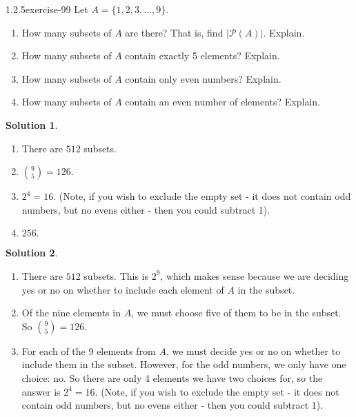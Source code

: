 \documentclass[twoside,11pt,]{book}
\numberwithin{equation}{chapter}
\newcommand{\pow}{\mathcal P}
\begin{document}
\begin{divisionsolution}{1.2.5}{}{exercise-99}%
\hypertarget{p-1598}{}%
Let \(A = \{1,2,3,\ldots,9\}\text{.}\)\leavevmode%
\begin{enumerate}[label=(\alph*)]
\item\hypertarget{li-1126}{}\hypertarget{p-1599}{}%
How many subsets of \(A\) are there? That is, find \(|\pow(A)|\text{.}\) Explain.%
\item\hypertarget{li-1127}{}\hypertarget{p-1601}{}%
How many subsets of \(A\) contain exactly 5 elements? Explain.%
\item\hypertarget{li-1128}{}\hypertarget{p-1603}{}%
How many subsets of \(A\) contain only even numbers? Explain.%
\item\hypertarget{li-1129}{}\hypertarget{p-1605}{}%
How many subsets of \(A\) contain an even number of elements? Explain.%
\end{enumerate}
%
\par\smallskip%
\noindent\textbf{Solution 1}.\quad%
\hypertarget{p-1607}{}%
\leavevmode%
\begin{enumerate}[label=(\alph*)]
\item\hypertarget{li-1130}{}\hypertarget{p-1608}{}%
There are \(512\) subsets.%
\item\hypertarget{li-1131}{}\hypertarget{p-1609}{}%
\({9 \choose 5} = 126\text{.}\)%
\item\hypertarget{li-1132}{}\hypertarget{p-1610}{}%
\(2^4 = 16\text{.}\) (Note, if you wish to exclude the empty set - it does not contain odd numbers, but no evens either - then you could subtract 1).%
\item\hypertarget{li-1133}{}\hypertarget{p-1611}{}%
\(256\text{.}\)%
\end{enumerate}
%
\par\smallskip%
\noindent\textbf{Solution 2}.\quad%
\hypertarget{p-1612}{}%
\leavevmode%
\begin{enumerate}[label=(\alph*)]
\item\hypertarget{li-1134}{}\hypertarget{p-1613}{}%
There are \(512\) subsets. This is \(2^9\text{,}\) which makes sense because we are deciding yes or no on whether to include each element of \(A\) in the subset.%
\item\hypertarget{li-1135}{}\hypertarget{p-1614}{}%
Of the nine elements in \(A\text{,}\) we must choose five of them to be in the subset. So \({9 \choose 5} = 126\text{.}\)%
\item\hypertarget{li-1136}{}\hypertarget{p-1615}{}%
For each of the 9 elements from \(A\text{,}\) we must decide yes or no on whether to include them in the subset. However, for the odd numbers, we only have one choice: no. So there are only 4 elements we have two choices for, so the answer is \(2^4 = 16\text{.}\) (Note, if you wish to exclude the empty set - it does not contain odd numbers, but no evens either - then you could subtract 1).%

\end{enumerate}
\end{divisionsolution}
\end{document}
